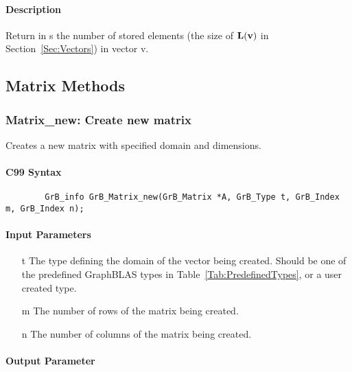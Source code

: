 \paragraph{Description}

Return in {\sf s} the number of stored elements (the size of $\bold{L}({\bf v})$
in Section~\ref{Sec:Vectors}) in vector {\sf v}.


\subsection{Matrix Methods}

\subsubsection{{\sf Matrix\_new}: Create new matrix}

Creates a new matrix with specified domain and dimensions.

\paragraph{C99 Syntax}

\begin{verbatim}
        GrB_info GrB_Matrix_new(GrB_Matrix *A, GrB_Type t, GrB_Index m, GrB_Index n);
\end{verbatim}

\paragraph{Input Parameters}

\begin{itemize}[leftmargin=1.1in]
    \item[{\sf t}] The type defining the domain of the vector being created. Should be one of the predefined
    GraphBLAS types in Table~\ref{Tab:PredefinedTypes}, or a user created type.
    \item[{\sf m}] The number of rows of the matrix being created.
    \item[{\sf n}] The number of columns of the matrix being created.
\end{itemize}

\paragraph{Output Parameter}

